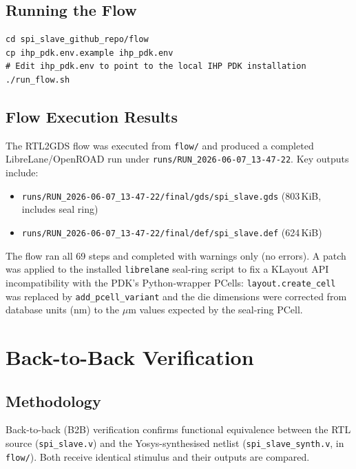 \documentclass[11pt]{article}
\begin{document}
\subsection{Running the Flow}
\begin{lstlisting}
cd spi_slave_github_repo/flow
cp ihp_pdk.env.example ihp_pdk.env
# Edit ihp_pdk.env to point to the local IHP PDK installation
./run_flow.sh
\end{lstlisting}

\subsection{Flow Execution Results}
The RTL2GDS flow was executed from \texttt{flow/} and produced a completed LibreLane/OpenROAD run under \texttt{runs/RUN\_2026-06-07\_13-47-22}. Key outputs include:

\begin{itemize}
  \item \texttt{runs/RUN\_2026-06-07\_13-47-22/final/gds/spi\_slave.gds} (803\,KiB, includes seal ring)
  \item \texttt{runs/RUN\_2026-06-07\_13-47-22/final/def/spi\_slave.def} (624\,KiB)
\end{itemize}

The flow ran all 69 steps and completed with warnings only (no errors). A patch was applied to the installed \texttt{librelane} seal-ring script to fix a KLayout API incompatibility with the PDK's Python-wrapper PCells: \texttt{layout.create\_cell} was replaced by \texttt{add\_pcell\_variant} and the die dimensions were corrected from database units (nm) to the \(\mu\)m values expected by the seal-ring PCell.

\section{Back-to-Back Verification}

\subsection{Methodology}
Back-to-back (B2B) verification confirms functional equivalence between the RTL source (\texttt{spi\_slave.v}) and the Yosys-synthesised netlist (\texttt{spi\_slave\_synth.v}, in \texttt{flow/}). Both receive identical stimulus and their outputs are compared.
\end{document}

